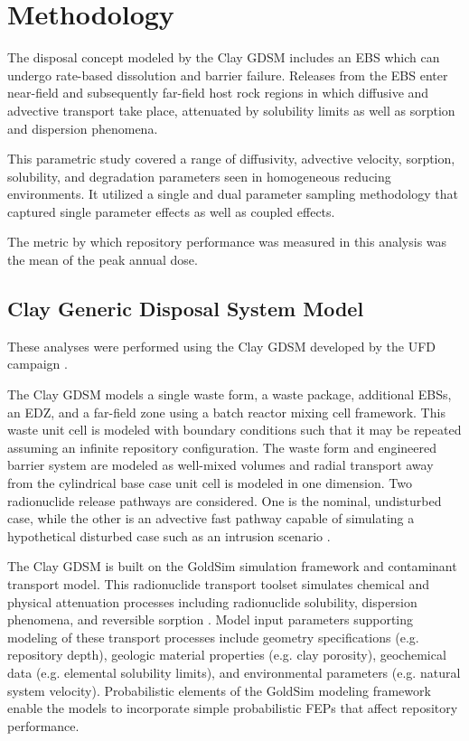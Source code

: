 \section{Methodology}

The disposal concept modeled by the Clay \gls{GDSM} includes an \gls{EBS} which 
can undergo rate-based dissolution and barrier failure. Releases from the 
\gls{EBS} enter near-field and subsequently far-field host rock regions in which 
diffusive and advective transport take place, attenuated by solubility limits as 
well as sorption and dispersion phenomena.  

This parametric study covered a range of diffusivity, advective velocity, 
sorption, solubility, and degradation parameters seen in homogeneous reducing 
environments. It utilized a single and dual parameter sampling methodology that 
captured single parameter effects as well as coupled effects.

The metric by which repository performance was measured in this analysis was the 
mean of the peak annual dose. 

\subsection{Clay Generic Disposal System Model}
These analyses were performed using the Clay \gls{GDSM} developed by the 
\gls{UFD} campaign \cite{clayton_generic_2011}. 

The Clay \gls{GDSM} models a single waste form, a waste package, additional 
\glspl{EBS}, an \gls{EDZ}, and a far-field zone using a batch reactor mixing 
cell framework.  This waste unit cell is modeled with boundary conditions such 
that it may be repeated assuming an infinite repository configuration. The waste 
form and engineered barrier system are modeled as well-mixed volumes and radial 
transport away from the cylindrical base case unit cell is modeled in one 
dimension. Two radionuclide release pathways are considered. One is the nominal, 
undisturbed case, while the other is an advective fast pathway capable of 
simulating a hypothetical disturbed case such as an intrusion scenario 
\cite{clayton_generic_2011}.

The Clay \gls{GDSM} is built on the GoldSim simulation framework and contaminant 
transport model.  This radionuclide transport toolset simulates chemical and 
physical attenuation processes including radionuclide solubility, dispersion 
phenomena, and reversible sorption \cite{golder_goldsim_2010, 
golder_goldsim_ct_2010}. Model input parameters supporting modeling of these 
transport processes include geometry specifications (e.g. repository depth), 
geologic material properties (e.g. clay porosity), geochemical data (e.g. 
elemental solubility limits), and environmental parameters (e.g. natural system 
velocity). Probabilistic elements of the GoldSim modeling framework enable the 
models to incorporate simple probabilistic \gls{FEPs} that affect repository 
performance.

